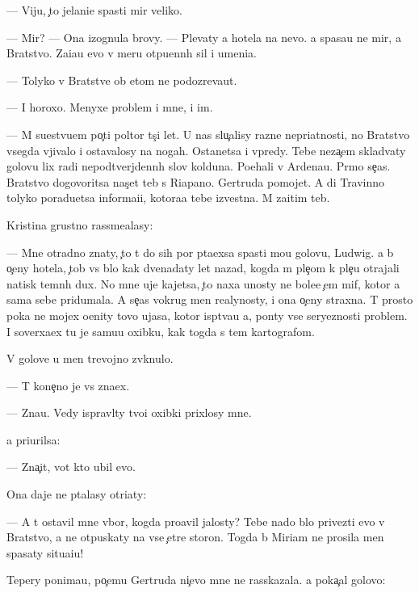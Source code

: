 \documentclass[10pt]{book}
\begin{document}
— Viju, {\c}to jelani{\y}e spasti mir veliko.

— Mir? — Ona izognula brovy. — Plevaty {\y}a hotela na nevo. {\Y}a spasa{\y}u ne mir, a Bratstvo. Za{\x}i{\x}a{\y}u {\y}evo v meru otpu{\x}enn{\yi}h sil i umeni{\y}a.

— Tolyko v Bratstve ob etom ne podozreva{\y}ut.

— I horoxo. Menyxe problem i mne, i im.

— M{\yi} su{\x}estvu{\y}em po{\c}ti poltor{\yi} t{\yi}s{\ia}{\c}i let. U nas slu{\c}alisy razn{\yi}{\y}e nepri{\y}atnosti, no Bratstvo vsegda v{\yi}jivalo i ostavalosy na nogah. Ostanetsa i vpredy. Tebe neza{\c}em sklad{\yi}vaty golovu lix radi nepodtverjdenn{\yi}h slov kolduna. Po{\y}ehali v Ardenau. Pr{\ia}mo se{\y}{\c}as. Bratstvo dogovoritsa nas{\c}et teb{\ia} s Riapano. Gertruda pomojet. A di Travinno tolyko poradu{\y}etsa informa{\q}i{\y}i, kotora{\y}a tebe izvestna. M{\yi} za{\x}itim teb{\ia}.

Kristina grustno rassme{\y}alasy:

— Mne otradno znaty, {\c}to t{\yi} do sih por p{\yi}ta{\y}exsa spasti mo{\y}u golovu, Ludwig. {\Y}a b{\yi} o{\c}eny hotela, {\c}tob{\yi} vs{\e} b{\yi}lo kak dvenad{\q}aty let nazad, kogda m{\yi} ple{\c}om k ple{\c}u otrajali natisk temn{\yi}h dux. No mne uje kajetsa, {\c}to naxa {\y}unosty ne bole{\y}e {\c}em mif, kotor{\yi}{\y} {\y}a sama sebe pridumala. A se{\y}{\c}as vokrug men{\ia} realynosty, i ona o{\c}eny straxna. T{\yi} prosto poka ne mojex o{\q}enity tovo ujasa, kotor{\yi}{\y} isp{\yi}t{\yi}va{\y}u {\y}a, pon{\ia}ty vse{\y} seryeznosti problem{\yi}. I soverxa{\y}ex tu je samu{\y}u oxibku, kak togda s tem kartografom.

V golove u men{\ia} trevojno zv{\ia}knulo.

— T{\yi} kone{\c}no je vs{\e} zna{\y}ex.

— Zna{\y}u. Vedy ispravl{\ia}ty tvo{\y}i oxibki prixlosy mne.

{\Y}a pri{\x}urilsa:

— Zna{\c}it, vot kto ubil {\y}evo.

Ona daje ne p{\yi}talasy otri{\q}aty:

— A t{\yi} ostavil mne v{\yi}bor, kogda pro{\y}avil jalosty? Tebe nado b{\yi}lo privezti {\y}evo v Bratstvo, a ne otpuskaty na vse {\c}et{\yi}re storon{\yi}. Togda b{\yi} Miriam ne prosila men{\ia} spasaty situa{\q}i{\y}u!

Tepery ponima{\y}u, po{\c}emu Gertruda ni{\c}evo mne ne rasskazala. {\Y}a poka{\c}al golovo{\y}:
\end{document}
